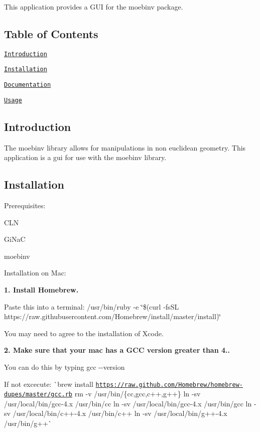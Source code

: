 This application provides a G\+UI for the moebinv package.

\subsection*{Table of Contents}


\begin{DoxyItemize}
\item \href{#introduction}{\tt Introduction}
\item \href{#installation}{\tt Installation}
\item \href{#documentation}{\tt Documentation}
\item \href{#usage}{\tt Usage}
\end{DoxyItemize}

\subsection*{Introduction}

The moebinv library allows for manipulations in non euclidean geometry. This application is a gui for use with the moebinv library.

\subsection*{Installation}

Prerequisites\+:
\begin{DoxyItemize}
\item C\+LN
\item Gi\+NaC
\item moebinv
\end{DoxyItemize}

Installation on Mac\+:

{\bfseries 1. Install Homebrew.}

Paste this into a terminal\+: {\ttfamily /usr/bin/ruby -\/e \char`\"{}\$(curl -\/fs\+S\+L https\+://raw.\+githubusercontent.\+com/\+Homebrew/install/master/install)\char`\"{}}

You may need to agree to the installation of Xcode.

{\bfseries 2. Make sure that your mac has a G\+CC version greater than 4..}

You can do this by typing {\ttfamily gcc -\/-\/version}

If not excecute\+: \`{}brew install \href{https://raw.github.com/Homebrew/homebrew-dupes/master/gcc.rb}{\tt https\+://raw.\+github.\+com/\+Homebrew/homebrew-\/dupes/master/gcc.\+rb} rm -\/v /usr/bin/\{cc,gcc,c++,g++\} ln -\/sv /usr/local/bin/gcc-\/4.\+x /usr/bin/cc ln -\/sv /usr/local/bin/gcc-\/4.\+x /usr/bin/gcc ln -\/sv /usr/local/bin/c++-\/4.\+x /usr/bin/c++ ln -\/sv /usr/local/bin/g++-\/4.\+x /usr/bin/g++\`{}

